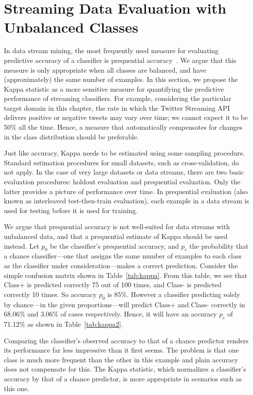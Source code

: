 \section{Streaming Data Evaluation with Unbalanced Classes} 
\label{sec:kappa}

In data stream mining, the most frequently used measure for evaluating
predictive accuracy of a classifier is prequential
accuracy~\cite{GamaSR09}. We argue that this measure is only
appropriate when all classes are balanced, and have (approximately)
the same number of examples.  In this section, we propose the Kappa
statistic as a more sensitive measure for quantifying the predictive
performance of streaming classifiers. For example, considering the
particular target domain in this chapter, the rate in which the Twitter
Streaming API delivers positive or negative tweets may vary over time;
we cannot expect it to be 50\% all the time. Hence, a measure that
automatically compensates for changes in the class distribution should
be preferable.

Just like accuracy, Kappa needs to be estimated using some sampling
procedure. Standard estimation procedures for small datasets, such as
cross-validation, do not apply. In the case of very large datasets or
data streams, there are two basic evaluation procedures: holdout
evaluation and prequential evaluation. Only the latter provides a
picture of performance over time. In prequential evaluation (also
known as interleaved test-then-train evaluation), each example in a
data stream is used for testing before it is used for training.

We argue that prequential accuracy is not well-suited for data streams
with unbalanced data, and that a prequential estimate of Kappa should
be used instead.
Let $p_0$ be the
classifier's prequential accuracy, and $p_c$ the probability that a
chance classifier---one that assigns the same number of examples to
each class as the classifier under consideration---makes a correct
prediction.
 Consider the simple confusion matrix shown in
Table~\ref{tab:kappa}.  From this table, we see that Class+ is
predicted correctly 75 out of 100 times, and Class- is predicted
correctly 10 times. So accuracy $p_0$ is $85\%$. However a classifier
predicting solely by chance---in the given proportions---will predict
Class+ and Class- correctly in 68.06\% and 3.06\% of cases
respectively. Hence, it will have an accuracy $p_c$ of 71.12\% as
shown in Table~\ref{tab:kappa2}.

Comparing the classifier's observed accuracy to that of a chance
predictor renders its performance far less impressive than it first
seems. The problem is that one class is much more frequent than the
other in this example and plain accuracy does not compensate for
this. The Kappa statistic, which normalizes a classifier's accuracy by
that of a chance predictor, is more appropriate in scenarios such as
this one.

